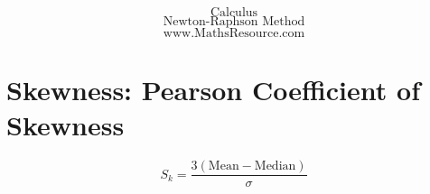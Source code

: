 
\usepackage{amsmath}
\usepackage{amssymb}
\usepackage{graphics}


\begin{frame}


{
\huge
\[ \mbox{Calculus} \]
\[ \mbox{Newton-Raphson Method} \]
}
{
\Large
\[ \mbox{www.MathsResource.com} \]
}
\end{frame}%







\section{Skewness: Pearson Coefficient of Skewness}


\[S_k = \frac{3(\mbox{Mean} - \mbox{Median} )}{\sigma} \]

